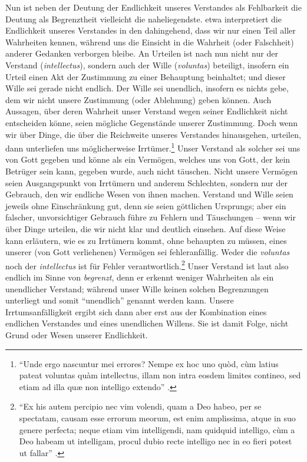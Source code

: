 \label{Absatz:DescarteszuEndlichkeitundVerhaeltnisvonWilleundVerstand}
Nun ist neben der Deutung der Endlichkeit unseres Verstandes als Fehlbarkeit
die Deutung als Begrenztheit vielleicht die naheliegendste.
 etwa interpretiert die
Endlichkeit unseres Verstandes in den 
dahingehend, dass wir nur einen Teil aller Wahrheiten kennen, während uns die
Einsicht in die Wahrheit (oder Falschheit) anderer Gedanken verborgen bleibe.
An Urteilen ist nach 
nun nicht nur der Verstand (\emph{intellectus}), sondern auch der Wille (\emph{voluntas})
beteiligt, insofern ein Urteil einen Akt der Zustimmung zu einer Behauptung
beinhaltet; und dieser Wille sei gerade nicht endlich. Der Wille sei unendlich, insofern es nichts gebe,
dem wir nicht unsere Zustimmung (oder Ablehnung) geben können. Auch Aussagen,
über deren Wahrheit unser Verstand wegen seiner Endlichkeit nicht entscheiden
könne, seien mögliche Gegenstände unserer Zustimmung. Doch wenn wir über Dinge,
die über die Reichweite unseres Verstandes hinausgehen, urteilen, dann unterliefen uns
möglicherweise Irrtümer.\footnote{\enquote{Unde ergo nascuntur mei errores?
Nempe ex hoc uno qu{\`o}d, c{\`u}m latius pateat voluntas qu{\`a}m intellectus, illam non intra
eosdem limites contineo, sed etiam ad illa qu{\ae} non intelligo extendo}
\parencite[][VII: 58.20--23]{Descartes:OeuvresdeDescartes1983}.} Unser
Verstand als solcher sei uns von Gott gegeben und könne als ein Vermögen,
welches uns von Gott, der kein Betrüger sein kann, gegeben wurde, auch nicht
täuschen. Nicht unsere Vermögen seien Ausgangspunkt von Irrtümern und
anderem Schlechten, sondern nur der Gebrauch, den wir endliche Wesen von
ihnen machen. Verstand und Wille seien jeweils ohne Einschränkung gut, denn sie
seien göttlichen Ursprungs; aber ein falscher, unvorsichtiger Gebrauch führe zu
Fehlern und Täuschungen -- wenn wir über Dinge urteilen, die wir nicht klar und
deutlich einsehen. Auf diese Weise kann
 erläutern, wie es zu Irrtümern
kommt, ohne behaupten zu müssen, eines unserer (von Gott verliehenen) Vermögen
sei fehleranfällig. Weder die \emph{voluntas} noch der \emph{intellectus} ist
für Fehler verantwortlich.\footnote{\enquote{Ex his autem percipio nec vim
volendi, quam a Deo habeo, per se spectatam, causam esse errorum meorum, est
enim amplissima, atque in suo genere perfecta; neque etiam vim intelligendi, nam
quidquid intelligo, c{\`u}m a Deo habeam ut intelligam, procul dubio recte
intelligo nec in eo fieri potest ut fallar} \parencite[][VII:
58.14--19]{Descartes:OeuvresdeDescartes1983}.}
Unser Verstand ist laut  also
endlich im Sinne von \emph{begrenzt}, denn er erkennt weniger Wahrheiten als ein unendlicher
Verstand; während unser Wille keinen solchen Begrenzungen unterliegt und somit
\enquote{unendlich} genannt werden kann. Unsere Irrtumsanfälligkeit ergibt sich
dann aber erst aus der Kombination eines endlichen Verstandes und eines
unendlichen Willens. Sie ist damit Folge, nicht Grund oder Wesen unserer
Endlichkeit.

